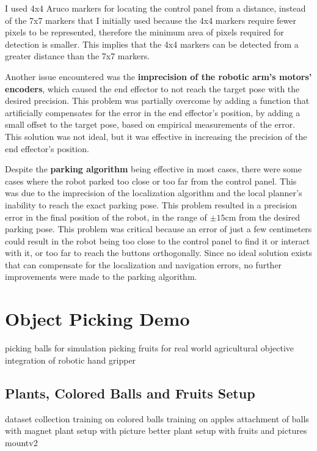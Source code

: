 I used 4x4 Aruco markers for locating the control panel from a distance, instead of the 7x7 markers that I initially 
used because the 4x4 markers require fewer pixels to be represented, therefore the minimum area of pixels required
for detection is smaller. This implies that the 4x4 markers can be detected from a greater distance than the 7x7 markers.

Another issue encountered was the \textbf{imprecision of the robotic arm's motors' encoders}, which caused the end effector
to not reach the target pose with the desired precision. This problem was partially overcome by adding a function
that artificially compensates for the error in the end effector's position, by adding a small offset 
to the target pose, based on empirical measurements of the error. This solution was not ideal, but it was effective
in increasing the precision of the end effector's position.

Despite the \textbf{parking algorithm} being effective in most cases, there were some cases where the robot parked too close
or too far from the control panel. This was due to the imprecision of the localization algorithm and the
local planner's inability to reach the exact parking pose. This problem resulted in a precision error 
in the final position of the robot, in the range of $\pm 15$cm from the desired parking pose. This problem was
critical because an error of just a few centimeters could result in the robot being too close to the control panel
to find it or interact with it, or too far to reach the buttons orthogonally. Since no ideal solution exists that
can compensate for the localization and navigation errors, no further improvements were made to the parking algorithm.

\section{Object Picking Demo}

picking balls for simulation
picking fruits for real world
agricultural objective
integration of robotic hand gripper

\subsection{Plants, Colored Balls and Fruits Setup}

dataset collection
training on colored balls
training on apples
attachment of balls with magnet
plant setup with picture
better plant setup with fruits and pictures
mountv2

